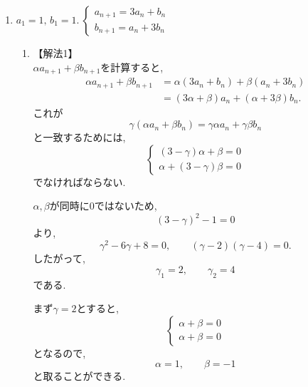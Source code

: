 \begin{enumerate}[label=(\arabic*),parsep=3pt]
  \item $\displaystyle a_1=1,\,b_1=1.\ \begin{cases}a_{n+1}=3a_n+b_n\\ b_{n+1}=a_n+3b_n\end{cases}$\\
        \begin{enumerate}
          \item 【解法1】\\
                $\alpha a_{n+1}+\beta b_{n+1}$を計算すると,
                \begin{align*}
                  \alpha a_{n+1}+\beta b_{n+1}
                   & =\alpha(3a_n+b_n)+\beta(a_n+3b_n)       \\
                   & =(3\alpha+\beta)a_n+(\alpha+3\beta)b_n.
                \end{align*}
                これが
                \[
                  \gamma(\alpha a_n+\beta b_n)
                  =\gamma\alpha a_n+\gamma\beta b_n
                \]
                と一致するためには,
                \[
                  \begin{cases}
                    (3-\gamma)\alpha+\beta=0 \\
                    \alpha+(3-\gamma)\beta=0
                  \end{cases}
                \]
                でなければならない.

                $\alpha,\beta$が同時に$0$ではないため,
                \[
                  (3-\gamma)^2-1=0
                \]
                より,
                \[
                  \gamma^2-6\gamma+8=0,
                  \qquad
                  (\gamma-2)(\gamma-4)=0.
                \]
                したがって,
                \[
                  \gamma_1=2,\qquad\gamma_2=4
                \]
                である.

                まず$\gamma=2$とすると,
                \[
                  \begin{cases}
                    \alpha+\beta=0 \\
                    \alpha+\beta=0
                  \end{cases}
                \]
                となるので,
                \[
                  \alpha=1,\qquad\beta=-1
                \]
                と取ることができる.


\end{enumerate}
\end{enumerate}
